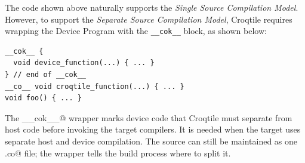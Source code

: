 The code shown above naturally supports the \emph{Single Source Compilation Model}. However, to support the \emph{Separate Source Compilation Model}, Croqtile requires wrapping the Device Program with the \texttt{\_\_cok\_\_} block, as shown below:

\begin{lstlisting}[language=croqtile,caption={Transpilation and Compilation}]
__cok__ {
  void device_function(...) { ... }
} // end of __cok__
__co__ void croqtile_function(...) { ... }
void foo() { ... }
\end{lstlisting}

The \co@__cok__@ wrapper marks device code that Croqtile must separate from host code before invoking the target compilers. It is needed when the target uses separate host and device compilation. The source can still be maintained as one \co@.co@ file; the wrapper tells the build process where to split it.
